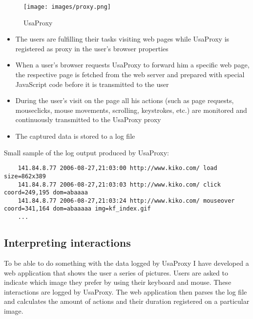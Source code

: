\begin{figure}[h] 
	\centering
	\texttt{[image: images/proxy.png]}
	\caption{UsaProxy}
\end{figure}
	
\begin{itemize}	
	\item The users are fulfilling their tasks visiting web pages while UsaProxy is registered as proxy in the user’s browser properties
	\item When a user’s browser requests UsaProxy to forward him a specific web page, the respective page is fetched from the web server and prepared with special JavaScript code before it is transmitted to the user
	\item During the user’s visit on the page all his actions (such as page requests, mouseclicks, mouse movements, scrolling, keystrokes, etc.) are monitored and continuously transmitted to the UsaProxy proxy
	\item The captured data is stored to a log file
\end{itemize}
	
Small sample of the log output produced by UsaProxy:
\begin{lstlisting}
	141.84.8.77 2006-08-27,21:03:00 http://www.kiko.com/ load size=862x389
	141.84.8.77 2006-08-27,21:03:03 http://www.kiko.com/ click coord=249,195 dom=abaaaa
	141.84.8.77 2006-08-27,21:03:24 http://www.kiko.com/ mouseover coord=341,164 dom=abaaaaa img=kf_index.gif
	...
\end{lstlisting}
	
\subsection{Interpreting interactions}
To be able to do something with the data logged by UsaProxy I have developed a web application that shows the user a series of pictures. Users are asked to indicate which image they prefer by using their keyboard and mouse. These interactions are logged by UsaProxy. The web application then parses the log file and calculates the amount of actions and their duration registered on a particular image.
